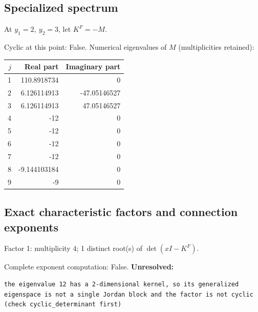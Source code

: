 \documentclass[10pt,a4paper]{article}
\newcommand{\fitmath}[1]{\sbox{\mathbox}{$\displaystyle #1$}\ifdim\wd\mathbox>\linewidth\resizebox{\linewidth}{!}{\usebox{\mathbox}}\else\usebox{\mathbox}\fi}
\begin{document}
\subsection*{Specialized spectrum}
At $y_1=2,\ y_2=3$, let $K^F=-M$.
\begin{center}\fitmath{\Delta=0}\end{center}
Cyclic at this point: False.
Numerical eigenvalues of $M$ (multiplicities retained):
\begin{center}\small\begin{tabular}{rrr}\toprule $j$ & Real part & Imaginary part\\\midrule
1 & 110.8918734 & 0\\
2 & 6.126114913 & -47.05146527\\
3 & 6.126114913 & 47.05146527\\
4 & -12 & 0\\
5 & -12 & 0\\
6 & -12 & 0\\
7 & -12 & 0\\
8 & -9.144103184 & 0\\
9 & -9 & 0\\
\bottomrule\end{tabular}\end{center}
\subsection*{Exact characteristic factors and connection exponents}
Factor 1: multiplicity 4; 1 distinct root(s) of $\det(xI-K^F)$.
\begin{center}\fitmath{\begin{aligned}p_{1}(x)&=x - 12\end{aligned}}\end{center}
Complete exponent computation: False.
\textbf{Unresolved:}

\begin{lstlisting}
the eigenvalue 12 has a 2-dimensional kernel, so its generalized eigenspace is not a single Jordan block and the factor is not cyclic (check cyclic_determinant first)
\end{lstlisting}
\end{document}
